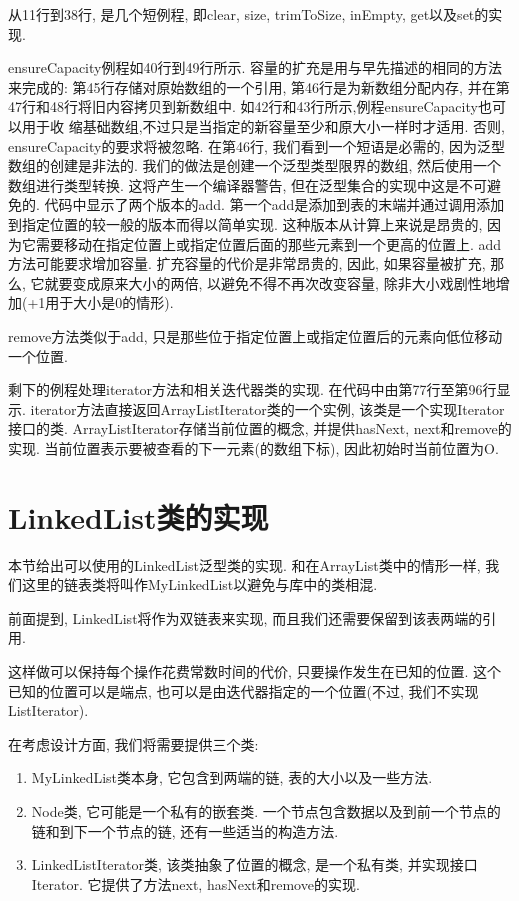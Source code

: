 \documentclass[oneside]{ctexbook}
\begin{document}
从11行到38行, 是几个短例程, 即clear, size, trimToSize, inEmpty, get以及set的实现.

ensureCapacity例程如40行到49行所示. 容量的扩充是用与早先描述的相同的方法来完成的: 第45行存储对原始数组的一个引用, 第46行是为新数组分配内存, 并在第47行和48行将旧内容拷贝到新数组中. 如42行和43行所示,例程ensureCapacity也可以用于收
缩基础数组,不过只是当指定的新容量至少和原大小一样时才适用. 否则, ensureCapacity的要求将被忽略. 在第46行, 我们看到一个短语是必需的, 因为泛型数组的创建是非法的. 我们的做法是创建一个泛型类型限界的数组, 然后使用一个数组进行类型转换. 这将产生一个编译器警告, 但在泛型集合的实现中这是不可避免的. 代码中显示了两个版本的add. 第一个add是添加到表的末端并通过调用添加到指定位置的较一般的版本而得以简单实现. 这种版本从计算上来说是昂贵的, 因为它需要移动在指定位置上或指定位置后面的那些元素到一个更高的位置上. add方法可能要求增加容量. 扩充容量的代价是非常昂贵的, 因此, 如果容量被扩充, 那么, 它就要变成原来大小的两倍, 以避免不得不再次改变容量, 除非大小戏剧性地增加(+1用于大小是0的情形).

remove方法类似于add, 只是那些位于指定位置上或指定位置后的元素向低位移动一个位置.

剩下的例程处理iterator方法和相关迭代器类的实现. 在代码中由第77行至第96行显示. iterator方法直接返回ArrayListIterator类的一个实例, 该类是一个实现Iterator接口的类. ArrayListIterator存储当前位置的概念, 并提供hasNext, next和remove的实现. 当前位置表示要被查看的下一元素(的数组下标), 因此初始时当前位置为O.

\section{LinkedList类的实现}

本节给出可以使用的LinkedList泛型类的实现. 和在ArrayList类中的情形一样, 我们这里的链表类将叫作MyLinkedList以避免与库中的类相混.

前面提到, LinkedList将作为双链表来实现, 而且我们还需要保留到该表两端的引用.

这样做可以保持每个操作花费常数时间的代价, 只要操作发生在已知的位置. 这个已知的位置可以是端点, 也可以是由迭代器指定的一个位置(不过, 我们不实现ListIterator).

在考虑设计方面, 我们将需要提供三个类:

\begin{enumerate}
    \item MyLinkedList类本身, 它包含到两端的链, 表的大小以及一些方法.
    \item Node类, 它可能是一个私有的嵌套类. 一个节点包含数据以及到前一个节点的链和到下一个节点的链, 还有一些适当的构造方法.
    \item LinkedListIterator类, 该类抽象了位置的概念, 是一个私有类, 并实现接口Iterator. 它提供了方法next, hasNext和remove的实现.
\end{enumerate}
\end{document}
